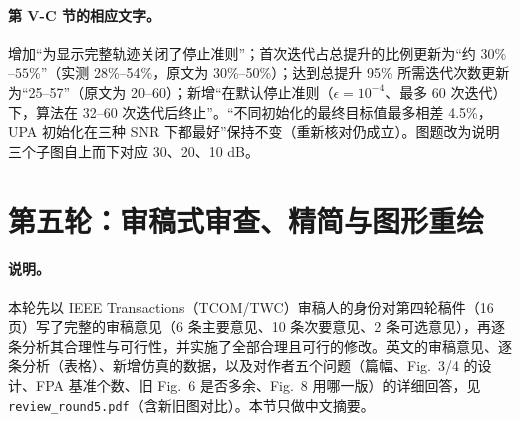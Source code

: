 \documentclass[11pt,a4paper]{ctexart}
\newcommand{\code}[1]{\texttt{#1}}
\begin{document}
\paragraph{第 V-C 节的相应文字。}增加“为显示完整轨迹关闭了停止准则”；首次迭代占总提升的比例更新为“约 $30\%$--$55\%$”（实测 28\%--54\%，原文为 30\%--50\%）；达到总提升 95\% 所需迭代次数更新为“25--57”（原文为 20--60）；新增“在默认停止准则（$\epsilon=10^{-4}$、最多 60 次迭代）下，算法在 32--60 次迭代后终止”。“不同初始化的最终目标值最多相差 4.5\%，UPA 初始化在三种 SNR 下都最好”保持不变（重新核对仍成立）。图题改为说明三个子图自上而下对应 30、20、10 dB。

\section{第五轮：审稿式审查、精简与图形重绘}
\paragraph{说明。}本轮先以 IEEE Transactions（TCOM/TWC）审稿人的身份对第四轮稿件（16 页）写了完整的审稿意见（6 条主要意见、10 条次要意见、2 条可选意见），再逐条分析其合理性与可行性，并实施了全部合理且可行的修改。英文的审稿意见、逐条分析（表格）、新增仿真的数据，以及对作者五个问题（篇幅、Fig.~3/4 的设计、FPA 基准个数、旧 Fig.~6 是否多余、Fig.~8 用哪一版）的详细回答，见 \code{review\_round5.pdf}（含新旧图对比）。本节只做中文摘要。
\end{document}
